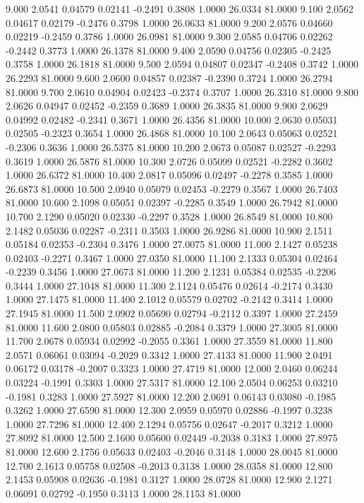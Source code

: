    9.000   2.0541   0.04579   0.02141  -0.2491   0.3808   1.0000  26.0334  81.0000
   9.100   2.0562   0.04617   0.02179  -0.2476   0.3798   1.0000  26.0633  81.0000
   9.200   2.0576   0.04660   0.02219  -0.2459   0.3786   1.0000  26.0981  81.0000
   9.300   2.0585   0.04706   0.02262  -0.2442   0.3773   1.0000  26.1378  81.0000
   9.400   2.0590   0.04756   0.02305  -0.2425   0.3758   1.0000  26.1818  81.0000
   9.500   2.0594   0.04807   0.02347  -0.2408   0.3742   1.0000  26.2293  81.0000
   9.600   2.0600   0.04857   0.02387  -0.2390   0.3724   1.0000  26.2794  81.0000
   9.700   2.0610   0.04904   0.02423  -0.2374   0.3707   1.0000  26.3310  81.0000
   9.800   2.0626   0.04947   0.02452  -0.2359   0.3689   1.0000  26.3835  81.0000
   9.900   2.0629   0.04992   0.02482  -0.2341   0.3671   1.0000  26.4356  81.0000
  10.000   2.0630   0.05031   0.02505  -0.2323   0.3654   1.0000  26.4868  81.0000
  10.100   2.0643   0.05063   0.02521  -0.2306   0.3636   1.0000  26.5375  81.0000
  10.200   2.0673   0.05087   0.02527  -0.2293   0.3619   1.0000  26.5876  81.0000
  10.300   2.0726   0.05099   0.02521  -0.2282   0.3602   1.0000  26.6372  81.0000
  10.400   2.0817   0.05096   0.02497  -0.2278   0.3585   1.0000  26.6873  81.0000
  10.500   2.0940   0.05079   0.02453  -0.2279   0.3567   1.0000  26.7403  81.0000
  10.600   2.1098   0.05051   0.02397  -0.2285   0.3549   1.0000  26.7942  81.0000
  10.700   2.1290   0.05020   0.02330  -0.2297   0.3528   1.0000  26.8549  81.0000
  10.800   2.1482   0.05036   0.02287  -0.2311   0.3503   1.0000  26.9286  81.0000
  10.900   2.1511   0.05184   0.02353  -0.2304   0.3476   1.0000  27.0075  81.0000
  11.000   2.1427   0.05238   0.02403  -0.2271   0.3467   1.0000  27.0350  81.0000
  11.100   2.1333   0.05304   0.02464  -0.2239   0.3456   1.0000  27.0673  81.0000
  11.200   2.1231   0.05384   0.02535  -0.2206   0.3444   1.0000  27.1048  81.0000
  11.300   2.1124   0.05476   0.02614  -0.2174   0.3430   1.0000  27.1475  81.0000
  11.400   2.1012   0.05579   0.02702  -0.2142   0.3414   1.0000  27.1945  81.0000
  11.500   2.0902   0.05690   0.02794  -0.2112   0.3397   1.0000  27.2459  81.0000
  11.600   2.0800   0.05803   0.02885  -0.2084   0.3379   1.0000  27.3005  81.0000
  11.700   2.0678   0.05934   0.02992  -0.2055   0.3361   1.0000  27.3559  81.0000
  11.800   2.0571   0.06061   0.03094  -0.2029   0.3342   1.0000  27.4133  81.0000
  11.900   2.0491   0.06172   0.03178  -0.2007   0.3323   1.0000  27.4719  81.0000
  12.000   2.0460   0.06244   0.03224  -0.1991   0.3303   1.0000  27.5317  81.0000
  12.100   2.0504   0.06253   0.03210  -0.1981   0.3283   1.0000  27.5927  81.0000
  12.200   2.0691   0.06143   0.03080  -0.1985   0.3262   1.0000  27.6590  81.0000
  12.300   2.0959   0.05970   0.02886  -0.1997   0.3238   1.0000  27.7296  81.0000
  12.400   2.1294   0.05756   0.02647  -0.2017   0.3212   1.0000  27.8092  81.0000
  12.500   2.1600   0.05600   0.02449  -0.2038   0.3183   1.0000  27.8975  81.0000
  12.600   2.1756   0.05633   0.02403  -0.2046   0.3148   1.0000  28.0045  81.0000
  12.700   2.1613   0.05758   0.02508  -0.2013   0.3138   1.0000  28.0358  81.0000
  12.800   2.1453   0.05908   0.02636  -0.1981   0.3127   1.0000  28.0728  81.0000
  12.900   2.1271   0.06091   0.02792  -0.1950   0.3113   1.0000  28.1153  81.0000

